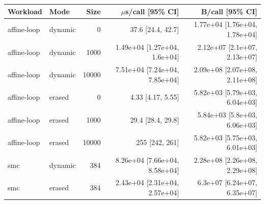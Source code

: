 \begin{tabular}{llrrr}
\toprule Workload & Mode & Size & $\mu$s/call [95\% CI] & B/call [95\% CI] \\
\midrule
affine-loop & dynamic & 0 & 37.6 [24.4, 42.7] & 1.77e+04 [1.76e+04, 1.78e+04] \\
affine-loop & dynamic & 1000 & 1.49e+04 [1.27e+04, 1.6e+04] & 2.12e+07 [2.1e+07, 2.13e+07] \\
affine-loop & dynamic & 10000 & 7.51e+04 [7.24e+04, 7.85e+04] & 2.09e+08 [2.07e+08, 2.11e+08] \\
affine-loop & erased & 0 & 4.33 [4.17, 5.55] & 5.82e+03 [5.79e+03, 6.04e+03] \\
affine-loop & erased & 1000 & 29.4 [28.4, 29.8] & 5.84e+03 [5.8e+03, 6.06e+03] \\
affine-loop & erased & 10000 & 255 [242, 261] & 5.82e+03 [5.75e+03, 6.01e+03] \\
smc & dynamic & 384 & 8.26e+04 [7.66e+04, 8.58e+04] & 2.28e+08 [2.26e+08, 2.29e+08] \\
smc & erased & 384 & 2.43e+04 [2.31e+04, 2.57e+04] & 6.3e+07 [6.24e+07, 6.35e+07] \\
\bottomrule
\end{tabular}
